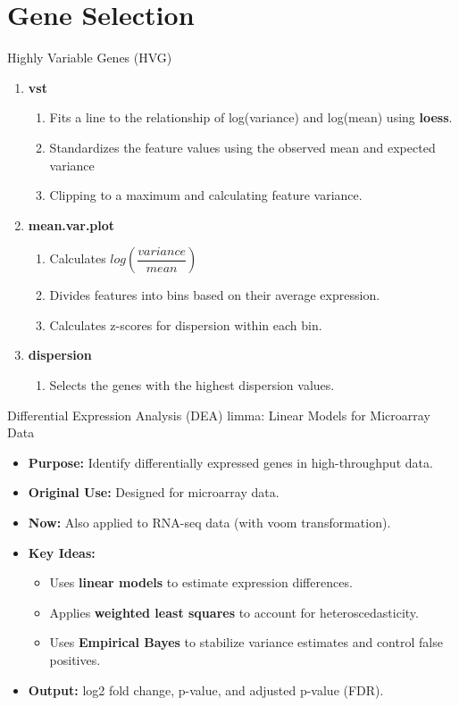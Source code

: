 \documentclass[12pt, aspectratio=43]{beamer}
\begin{document}
	\section{Gene Selection}
	\begin{frame}{Highly Variable Genes (HVG)}
		\begin{enumerate}
			\item \textbf{vst}
			\begin{enumerate}
				\item Fits a line to the relationship of log(variance) and log(mean) using \textbf{loess}.
				\item Standardizes the feature values using the observed mean and expected variance
				\item Clipping to a maximum and calculating feature variance.
			\end{enumerate}
			\item \textbf{mean.var.plot}
			\begin{enumerate}
				\item Calculates $log(\dfrac{variance}{mean})$
				\item Divides features into bins based on their average expression.
				\item Calculates z-scores for dispersion within each bin.
			\end{enumerate}
			\item \textbf{dispersion}
			\begin{enumerate}
				\item Selects the genes with the highest dispersion values.
			\end{enumerate}
		\end{enumerate}
	\end{frame}
	
	\begin{frame}{Differential Expression Analysis (DEA)}
		limma: Linear Models for Microarray Data
	
	\begin{itemize}
		\item \textbf{Purpose:} Identify differentially expressed genes in high-throughput data.
		\item \textbf{Original Use:} Designed for microarray data.
		\item \textbf{Now:} Also applied to RNA-seq data (with voom transformation).
		\item \textbf{Key Ideas:}
		\begin{itemize}
			\item Uses \textbf{linear models} to estimate expression differences.
			\item Applies \textbf{weighted least squares} to account for heteroscedasticity.
			\item Uses \textbf{Empirical Bayes} to stabilize variance estimates and control false positives.
		\end{itemize}
		\item \textbf{Output:} log2 fold change, p-value, and adjusted p-value (FDR).
	\end{itemize}
	
	\end{frame}
	
\end{document}
